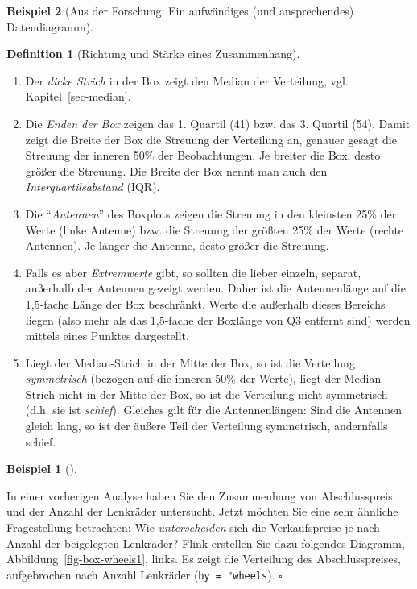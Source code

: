 \documentclass[
  a4paper,
]{scrbook}
\providecommand{\tightlist}{%
  \setlength{\itemsep}{0pt}\setlength{\parskip}{0pt}}\usepackage{longtable,booktabs,array}
\theoremstyle{definition}
\newtheorem{example}{Beispiel}[chapter]
\theoremstyle{definition}
\newtheorem{definition}{Definition}[chapter]
\theoremstyle{definition}
\theoremstyle{remark}
\begin{document}
\begin{example}[Aus der Forschung: Ein aufwändiges (und ansprechendes)
Datendiagramm]
\begin{definition}[Richtung und Stärke eines
Zusammenhang]
\begin{enumerate}
\def\labelenumi{\arabic{enumi}.}
\tightlist
\item
  Der \emph{dicke Strich} in der Box zeigt den Median der Verteilung,
  vgl. Kapitel~\ref{sec-median}.
\item
  Die \emph{Enden der Box} zeigen das 1. Quartil (41) bzw. das 3.
  Quartil (54). Damit zeigt die Breite der Box die Streuung der
  Verteilung an, genauer gesagt die Streuung der inneren 50\% der
  Beobachtungen. Je breiter die Box, desto größer die Streuung. Die
  Breite der Box nennt man auch den \emph{Interquartilsabstand} (IQR).
\item
  Die ``\emph{Antennen}'' des Boxplots zeigen die Streuung in den
  kleinsten 25\% der Werte (linke Antenne) bzw. die Streuung der größten
  25\% der Werte (rechte Antennen). Je länger die Antenne, desto größer
  die Streuung.
\item
  Falls es aber \emph{Extremwerte} gibt, so sollten die lieber einzeln,
  separat, außerhalb der Antennen gezeigt werden. Daher ist die
  Antennenlänge auf die 1,5-fache Länge der Box beschränkt. Werte die
  außerhalb dieses Bereichs liegen (also mehr als das 1,5-fache der
  Boxlänge von Q3 entfernt sind) werden mittels eines Punktes
  dargestellt.
\item
  Liegt der Median-Strich in der Mitte der Box, so ist die Verteilung
  \emph{symmetrisch} (bezogen auf die inneren 50\% der Werte), liegt der
  Median-Strich nicht in der Mitte der Box, so ist die Verteilung nicht
  symmetrisch (d.h. sie ist \emph{schief}). Gleiches gilt für die
  Antennenlängen: Sind die Antennen gleich lang, so ist der äußere Teil
  der Verteilung symmetrisch, andernfalls schief.
\end{enumerate}

\begin{example}[]\protect\hypertarget{exm-Boxplots}{}\label{exm-Boxplots}

In einer vorherigen Analyse haben Sie den Zusammenhang von
Abschlusspreis und der Anzahl der Lenkräder untersucht. Jetzt möchten
Sie eine sehr ähnliche Fragestellung betrachten: Wie
\emph{unterscheiden} sich die Verkaufspreise je nach Anzahl der
beigelegten Lenkräder? Flink erstellen Sie dazu folgendes Diagramm,
Abbildung~\ref{fig-box-wheels1}, links. Es zeigt die Verteilung des
Abschlusspreises, aufgebrochen nach Anzahl Lenkräder
(\texttt{by\ =\ "wheels}). \(\square\)

\end{example}


\end{definition}
\end{example}
\end{document}
